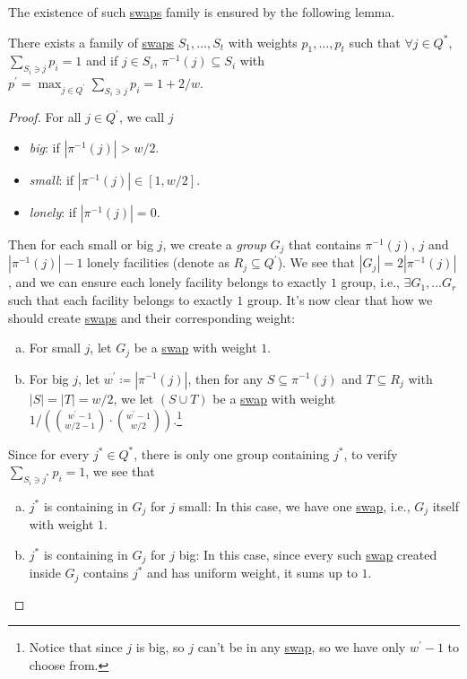 The existence of such \hyperref[not:swap]{swaps} family is ensured by the following lemma.
\begin{lemma}\label{lma:lec8}
	There exists a family of \hyperref[not:swap]{swaps} \(S_1, \ldots, S_t\) with weights \(p_1, \ldots  , p_t\) such that \(\forall j\in Q^{\ast} \), \(\sum_{S_i \ni j}p_i = 1\) and if \(j\in S_i\), \(\pi ^{-1} (j)\subseteq S_i\) with \(p^\prime = \max _{j\in Q^\prime }\sum_{S_i\ni j}p_i = 1 + 2 / w\).
\end{lemma}
\begin{proof}
	For all \(j\in Q^\prime \), we call \(j\)
	\begin{itemize}
		\item \emph{big}: if \(\left\vert \pi ^{-1} (j) \right\vert > w / 2\).
		\item \emph{small}: if \(\left\vert \pi ^{-1} (j) \right\vert \in [1, w / 2]\).
		\item \emph{lonely}: if \(\left\vert \pi ^{-1} (j) \right\vert = 0\).
	\end{itemize}
	Then for each small or big \(j\), we create a \emph{group} \(G_j\) that contains \(\pi ^{-1} (j)\), \(j\) and \(\left\vert \pi ^{-1} (j) \right\vert - 1\) lonely facilities (denote as \(R_j \subseteq Q^\prime \)). We see that \(\left\vert G_j \right\vert = 2 \left\vert \pi ^{-1} (j) \right\vert \), and we can ensure each lonely facility belongs to exactly \(1\) group, i.e., \(\exists G_1, \ldots G_r\) such that each facility belongs to exactly \(1\) group. It's now clear that how we should create \hyperref[not:swap]{swaps} and their corresponding weight:
	\begin{enumerate}[(a)]
		\item For small \(j\), let \(G_j\) be a \hyperref[not:swap]{swap} with weight \(1\).
		\item For big \(j\), let \(w^\prime \coloneqq \left\vert \pi ^{-1} (j) \right\vert \), then for any \(S \subseteq \pi ^{-1} (j)\) and \(T \subseteq R_j\) with \(\left\vert S \right\vert = \left\vert T \right\vert = w / 2\), we let \((S \cup T)\) be a \hyperref[not:swap]{swap} with weight \(1 / \left( \binom{w^\prime -1}{w / 2 - 1} \cdot \binom{w^\prime - 1}{w / 2} \right) \).\footnote{Notice that since \(j\) is big, so \(j\) can't be in any \hyperref[not:swap]{swap}, so we have only \(w^\prime - 1\) to choose from.}
	\end{enumerate}
	Since for every \(j^{\ast} \in Q^{\ast} \), there is only one group containing \(j^{\ast}\), to verify \(\sum_{S_i \ni j^{\ast} }p_i = 1 \), we see that
	\begin{enumerate}[(a)]
		\item \(j^{\ast} \) is containing in \(G_j\) for \(j\) small: In this case, we have one \hyperref[not:swap]{swap}, i.e., \(G_j\) itself with weight \(1\).
		\item \(j^{\ast} \) is containing in \(G_j\) for \(j\) big: In this case, since every such \hyperref[not:swap]{swap} created inside \(G_j\) contains \(j^{\ast} \) and has uniform weight, it sums up to \(1\).
	\end{enumerate}


\end{proof}
